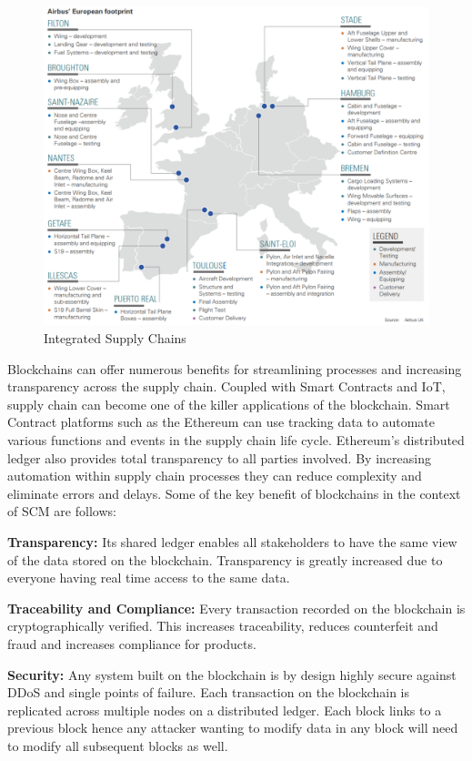 \begin{figure}[h]
	\centering
    \includegraphics[width=120mm,scale=1]{figs/Airbus-1}
	\caption{Integrated Supply Chains \cite{Airbus:ADS}}
	\label{fig:Airbus} 
\end{figure} 

\clearpage

Blockchains can offer numerous benefits for streamlining processes and increasing transparency across the supply chain. Coupled with Smart Contracts and IoT, supply chain can become one of the killer applications of the blockchain. Smart Contract platforms such as the Ethereum can use tracking data to automate various functions and events in the supply chain life cycle. Ethereum’s distributed ledger also provides total transparency to all parties involved. By increasing automation within supply chain processes they can reduce complexity and eliminate errors and delays. Some of the key benefit of blockchains in the context of SCM are follows:

\textbf{Transparency:}
Its shared ledger enables all stakeholders to have the same view of the data stored on the blockchain. Transparency is greatly increased due to everyone having real time access to the same data.

\textbf{Traceability and Compliance:}
Every transaction recorded on the blockchain is cryptographically verified. This increases traceability, reduces counterfeit and fraud and increases compliance for products. 

\textbf{Security:}
Any system built on the blockchain is by design highly secure against DDoS and single points of failure. Each transaction on the blockchain is replicated across multiple nodes on a distributed ledger. Each block links to a previous block hence any attacker wanting to modify data in any block will need to modify all subsequent blocks as well.

